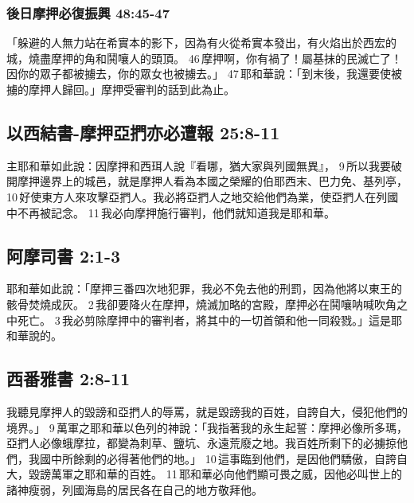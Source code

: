 \subsubsection{後日摩押必復振興 48:45-47}
「躲避的人無力站在希實本的影下，因為有火從希實本發出，有火焰出於西宏的城，燒盡摩押的角和鬨嚷人的頭頂。 46 摩押啊，你有禍了！屬基抹的民滅亡了！因你的眾子都被擄去，你的眾女也被擄去。」 47 耶和華說：「到末後，我還要使被擄的摩押人歸回。」摩押受審判的話到此為止。

\subsection{以西結書-摩押亞捫亦必遭報 25:8-11}
主耶和華如此說：因摩押和西珥人說『看哪，猶大家與列國無異』， 9 所以我要破開摩押邊界上的城邑，就是摩押人看為本國之榮耀的伯耶西末、巴力免、基列亭， 10 好使東方人來攻擊亞捫人。我必將亞捫人之地交給他們為業，使亞捫人在列國中不再被記念。 11 我必向摩押施行審判，他們就知道我是耶和華。


\subsection{阿摩司書 2:1-3}
耶和華如此說：「摩押三番四次地犯罪，我必不免去他的刑罰，因為他將以東王的骸骨焚燒成灰。 2 我卻要降火在摩押，燒滅加略的宮殿，摩押必在鬨嚷呐喊吹角之中死亡。 3 我必剪除摩押中的審判者，將其中的一切首領和他一同殺戮。」這是耶和華說的。

\subsection{西番雅書 2:8-11}
我聽見摩押人的毀謗和亞捫人的辱罵，就是毀謗我的百姓，自誇自大，侵犯他們的境界。」 9 萬軍之耶和華以色列的神說：「我指著我的永生起誓：摩押必像所多瑪，亞捫人必像蛾摩拉，都變為刺草、鹽坑、永遠荒廢之地。我百姓所剩下的必擄掠他們，我國中所餘剩的必得著他們的地。」 10 這事臨到他們，是因他們驕傲，自誇自大，毀謗萬軍之耶和華的百姓。 11 耶和華必向他們顯可畏之威，因他必叫世上的諸神瘦弱，列國海島的居民各在自己的地方敬拜他。

